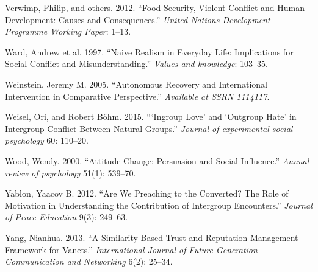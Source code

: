 \documentclass[11pt]{article}
\begin{document}
\leavevmode\hypertarget{ref-verwimp2012food}{}%
Verwimp, Philip, and others. 2012. ``Food Security, Violent Conflict and
Human Development: Causes and Consequences.'' \emph{United Nations
Development Programme Working Paper}: 1--13.

\leavevmode\hypertarget{ref-ward1997naive}{}%
Ward, Andrew et al. 1997. ``Naive Realism in Everyday Life: Implications
for Social Conflict and Misunderstanding.'' \emph{Values and knowledge}:
103--35.

\leavevmode\hypertarget{ref-weinstein2005autonomous}{}%
Weinstein, Jeremy M. 2005. ``Autonomous Recovery and International
Intervention in Comparative Perspective.'' \emph{Available at SSRN
1114117}.

\leavevmode\hypertarget{ref-weisel2015ingroup}{}%
Weisel, Ori, and Robert Böhm. 2015. ```Ingroup Love' and `Outgroup Hate'
in Intergroup Conflict Between Natural Groups.'' \emph{Journal of
experimental social psychology} 60: 110--20.

\leavevmode\hypertarget{ref-wood2000attitude}{}%
Wood, Wendy. 2000. ``Attitude Change: Persuasion and Social Influence.''
\emph{Annual review of psychology} 51(1): 539--70.

\leavevmode\hypertarget{ref-yablon2012we}{}%
Yablon, Yaacov B. 2012. ``Are We Preaching to the Converted? The Role of
Motivation in Understanding the Contribution of Intergroup Encounters.''
\emph{Journal of Peace Education} 9(3): 249--63.

\leavevmode\hypertarget{ref-yang2013similarity}{}%
Yang, Nianhua. 2013. ``A Similarity Based Trust and Reputation
Management Framework for Vanets.'' \emph{International Journal of Future
Generation Communication and Networking} 6(2): 25--34.
\end{document}
